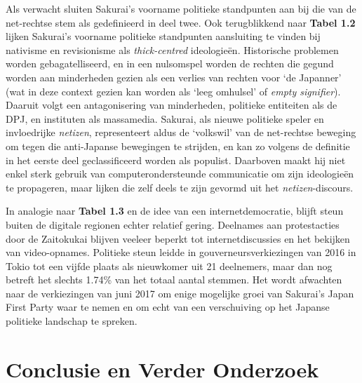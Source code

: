 \documentclass[10.5pt,dutch,]{article}
\begin{document}
Als verwacht sluiten Sakurai's voorname politieke standpunten aan bij
die van de net-rechtse stem als gedefinieerd in deel twee. Ook
terugblikkend naar \textbf{Tabel 1.2} lijken Sakurai's voorname
politieke standpunten aansluiting te vinden bij nativisme en
revisionisme als \emph{thick-centred} ideologieën. Historische problemen
worden gebagatelliseerd, en in een nulsomspel worden de rechten die
gegund worden aan minderheden gezien als een verlies van rechten voor
`de Japanner' (wat in deze context gezien kan worden als `leeg omhulsel'
of \emph{empty signifier}). Daaruit volgt een antagonisering van
minderheden, politieke entiteiten als de DPJ, en instituten als
massamedia. Sakurai, als nieuwe politieke speler en invloedrijke
\emph{netizen}, representeert aldus de `volkswil' van de net-rechtse
beweging om tegen die anti-Japanse bewegingen te strijden, en kan zo
volgens de definitie in het eerste deel geclassificeerd worden als
populist. Daarboven maakt hij niet enkel sterk gebruik van
computerondersteunde communicatie om zijn ideologieën te propageren,
maar lijken die zelf deels te zijn gevormd uit het
\emph{netizen}-discours.

In analogie naar \textbf{Tabel 1.3} en de idee van een
internetdemocratie, blijft steun buiten de digitale regionen echter
relatief gering. Deelnames aan protestacties door de Zaitokukai blijven
veeleer beperkt tot internetdiscussies en het bekijken van
video-opnames. Politieke steun leidde in gouverneursverkiezingen van
2016 in Tokio tot een vijfde plaats als nieuwkomer uit 21 deelnemers,
maar dan nog betreft het slechts 1.74\% van het totaal aantal stemmen.
Het wordt afwachten naar de verkiezingen van juni 2017 om enige
mogelijke groei van Sakurai's Japan First Party waar te nemen en om echt
van een verschuiving op het Japanse politieke landschap te spreken.

\newpage

\section{Conclusie en Verder
Onderzoek}\label{conclusie-en-verder-onderzoek}
\end{document}
